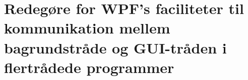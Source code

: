 \section{Redegøre for WPF's faciliteter til kommunikation mellem bagrundstråde og GUI-tråden i flertrådede programmer}\label{sec:spm8}


